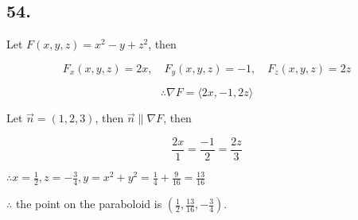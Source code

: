 \documentclass{article}
\begin{document}
  \subsection*{54. }

  Let $F(x, y, z) = x^2 - y + z^2$, then

  $$F_x(x, y, z) = 2x, \quad F_y(x, y, z) = -1, \quad F_z(x, y, z) = 2z$$

  $$\therefore \nabla F = \langle 2x, -1, 2z \rangle$$

  Let $\overrightarrow{n} = (1, 2, 3)$, then $\overrightarrow{n} \parallel \nabla F$, then

  $$\frac{2x}{1} = \frac{-1}{2} = \frac{2z}{3}$$

  $\therefore x = \frac 1 2, z = -\frac{3}{4}, y = x^2 + y^2 = \frac{1}{4} + \frac{9}{16} = \frac{13}{16}$

  $\therefore$ the point on the paraboloid is $(\frac 1 2, \frac{13}{16}, -\frac 3 4)$.
\end{document}
